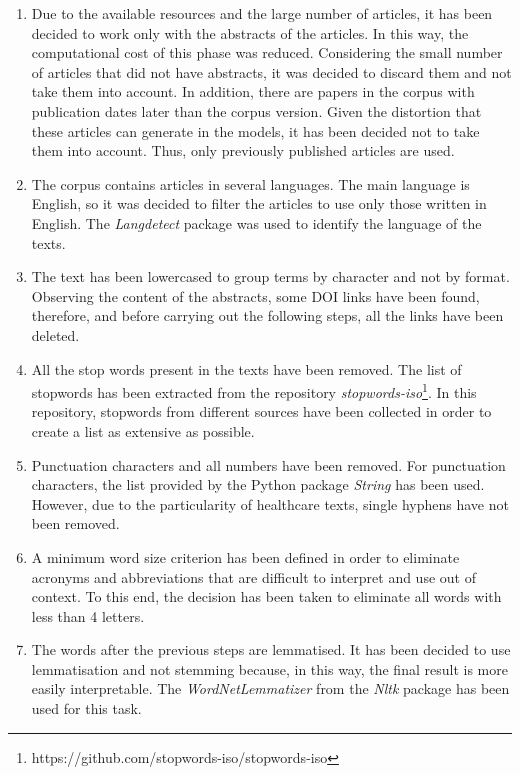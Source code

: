 \documentclass[a4paper,10pt]{article}
\begin{document}
\begin{enumerate}
    \item Due to the available resources and the large number of articles, it has been decided to work only with the abstracts of the articles. In this way, the computational cost of this phase was reduced. Considering the small number of articles that did not have abstracts, it was decided to discard them and not take them into account. In addition, there are papers in the corpus with publication dates later than the corpus version. Given the distortion that these articles can generate in the models, it has been decided not to take them into account. Thus, only previously published articles are used.

    \item The corpus contains articles in several languages. The main language is English, so it was decided to filter the articles to use only those written in English. The \textit{Langdetect} package was used to identify the language of the texts.

    \item The text has been lowercased to group terms by character and not by format. Observing the content of the abstracts, some DOI links have been found, therefore, and before carrying out the following steps, all the links have been deleted.

    \item All the stop words present in the texts have been removed. The list of stopwords has been extracted from the repository \textit{stopwords-iso}\footnote{https://github.com/stopwords-iso/stopwords-iso}. In this repository, stopwords from different sources have been collected in order to create a list as extensive as possible.

    \item Punctuation characters and all numbers have been removed. For punctuation characters, the list provided by the Python package \textit{String} has been used. However, due to the particularity of healthcare texts, single hyphens have not been removed.

    \item A minimum word size criterion has been defined in order to eliminate acronyms and abbreviations that are difficult to interpret and use out of context. To this end, the decision has been taken to eliminate all words with less than 4 letters.

    \item The words after the previous steps are lemmatised. It has been decided to use lemmatisation and not stemming because, in this way, the final result is more easily interpretable. The \textit{WordNetLemmatizer} from the \textit{Nltk} package has been used for this task.


\end{enumerate}
\end{document}
